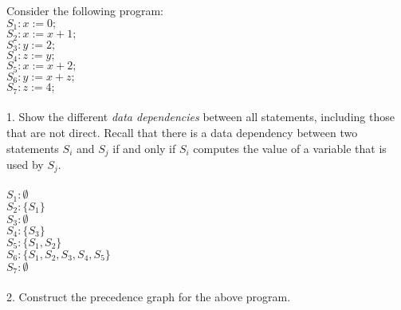 \documentclass[12pt]{article}
\newenvironment{problem}[2][Problem]{\begin{trivlist}
\item[\hskip \labelsep {\bfseries #1}\hskip \labelsep {\bfseries #2.}]}{\end{trivlist}}
\begin{document}
\begin{problem}{2}
    Consider the following program:\\
    $S_1:x:=0;$\\
    $S_2:x:=x+1;$\\
    $S_3:y:=2;$\\
    $S_4:z:=y;$\\
    $S_5:x:=x+2;$\\
    $S_6:y:=x+z;$\\
    $S_7:z:=4;$\\\\
    1. Show the different \emph{data dependencies} between all statements, including those that are not
    direct. Recall that there is a data dependency between two statements $S_i$ and $S_j$ if and only
    if $S_i$ computes the value of a variable that is used by $S_j$.\\\\
    $S_1:\emptyset$\\
    $S_2:\{S_1\}$\\
    $S_3:\emptyset$\\
    $S_4:\{S_3\}$\\
    $S_5:\{S_1, S_2\}$\\
    $S_6:\{S_1, S_2, S_3, S_4, S_5\}$\\
    $S_7:\emptyset$\\\\
    2. Construct the precedence graph for the above program. 

\end{problem}
\pagebreak
\end{document}
